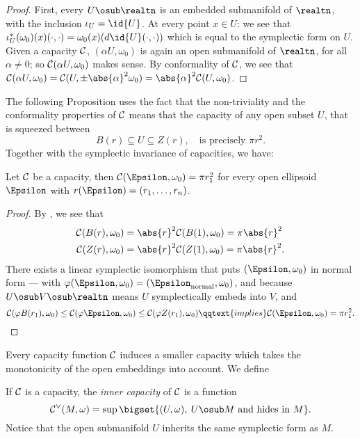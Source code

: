 \documentclass[../main-v2-manifolds.tex]{subfiles}
\begin{document}
\begin{proof}
    First, every $U\osub\realtn$ is an embedded submanifold of $\realtn$, with the inclusion $\iota_{U} = \id{U}$. At every point $x\in U$: we see that $\iota_U^{*}(\omega_0)(x)(\cdot,\cdot) = \omega_0(x)(d\id{U}(\cdot,\cdot))$ which is equal to the symplectic form on $U$. Given a capacity $\mathcal{C}$, $(\alpha U,\omega_0)$ is again an open submanifold of $\realtn$, for all $\alpha\neq 0$; so $\mathcal{C}(\alpha U,\omega_0)$ makes sense. By conformality of $\mathcal{C}$, we see that$\frakc(\alpha U,\omega_0) = \frakc(U,\pm\abs{\alpha}^2\omega_0) = \abs{\alpha}^2\frakc(U,\omega_0)$.
\end{proof}
The following Proposition uses the fact that the non-triviality and the conformality properties of $\mathcal{C}$ means that the capacity of any open subset $U$, that is squeezed between 
\[
    B(r)\subseteq U\subseteq Z(r),\quad \text{is precisely }\pi r^2.
\]
Together with the symplectic invariance of capacities, we have:
\begin{wts}
    Let $\mathcal{C}$ be a capacity, then $\frakc(\Epsilon,\omega_0) = \pi r_1^2$ for every open ellipsoid $\Epsilon$ with $r(\Epsilon) = (r_1,\ldots, r_n)$.
\end{wts}
\begin{proof}
    By , we see that
    \begin{align*}
        \frakc(B(r),\omega_0) &= \abs{r}^2\frakc(B(1),\omega_0) = \pi\abs{r}^2\\
        \frakc(Z(r),\omega_0) &= \abs{r}^2\frakc(Z(1),\omega_0) = \pi\abs{r}^2.
    \end{align*}
    There exists a linear symplectic isomorphism that puts $(\Epsilon,\omega_0)$ in normal form --- with $\varphi(\Epsilon,\omega_0) = (\Epsilon_{\mathrm{normal}}, \omega_0)$, and because $U\osub V\osub \realtn$ means $U$ symplectically embeds into $V$, and
    \[
        \frakc(\varphi B(r_1),\omega_0)\leq \frakc(\varphi\Epsilon,\omega_0)\leq \frakc(\varphi Z(r_1),\omega_0)\qqtext{implies} \frakc(\Epsilon,\omega_0) = \pi r_1^2.
    \]
\end{proof}
Every capacity function $\mathcal{C}$ induces a smaller capacity which takes the monotonicity of the open embeddings into account. We define 
\begin{definition}
    If $\mathcal{C}$ is a capacity, the \emph{inner capacity} of $\mathcal{C}$ is a function
    \[
        \frakc^{\vee}(M,\omega) = \sup\bigset{(U,\omega),\: U\osub M\text{ and hides in } M}.
    \]
    Notice that the open submanifold $U$ inherits the same symplectic form as $M$. 
\end{definition}
\end{document}
